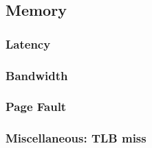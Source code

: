 \documentclass[paper=letter]{article}
\begin{document}
\newpage

\subsection{Memory}

\subsubsection{Latency}

\newpage

\subsubsection{Bandwidth}

\newpage

\subsubsection{Page Fault}

\newpage

\subsubsection{Miscellaneous: TLB miss}

\newpage

\printbibliography
\end{document}
